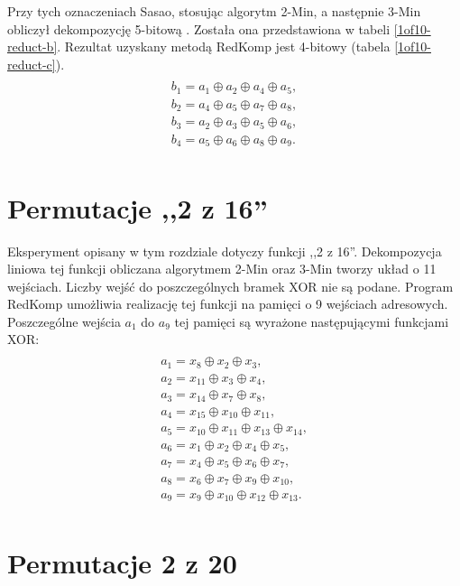 Przy tych oznaczeniach Sasao,
stosując algorytm 2-Min,
a następnie 3-Min obliczył dekompozycję 5-bitową \cite{sasao-s-min}.
Została ona przedstawiona w tabeli \ref{1of10-reduct-b}.
Rezultat uzyskany metodą RedKomp jest 4-bitowy (tabela \ref{1of10-reduct-c}).
\begin{multline} \\
b_1 = a_1 \oplus a_2 \oplus a_4 \oplus a_5, \\
b_2 = a_4 \oplus a_5 \oplus a_7 \oplus a_8, \\
b_3 = a_2 \oplus a_3 \oplus a_5 \oplus a_6, \\
b_4 = a_5 \oplus a_6 \oplus a_8 \oplus a_9. \\
\end{multline}




\section{Permutacje ,,2 z 16''}

Eksperyment opisany w tym rozdziale dotyczy funkcji ,,2 z 16''.
Dekompozycja liniowa tej funkcji obliczana algorytmem 2-Min oraz 3-Min \cite{sasao-s-min} tworzy układ o 11 wejściach.
Liczby wejść do poszczególnych bramek XOR nie są podane.
Program RedKomp umożliwia realizację tej funkcji na pamięci o 9 wejściach adresowych.
Poszczególne wejścia $a_1$ do $a_9$ tej pamięci są wyrażone następującymi funkcjami XOR:
\begin{multline} \\
a_1 = x_8 \oplus x_2 \oplus x_3, \\
a_2 = x_{11} \oplus x_3 \oplus x_4, \\
a_3 = x_{14} \oplus x_7 \oplus x_8, \\
a_4 = x_{15} \oplus x_{10} \oplus x_{11}, \\
a_5 = x_{10} \oplus x_{11} \oplus x_{13} \oplus x_{14}, \\
a_6 = x_1 \oplus x_2 \oplus x_4 \oplus x_5, \\
a_7 = x_4 \oplus x_5 \oplus x_6 \oplus x_7, \\
a_8 = x_6 \oplus x_7 \oplus x_9 \oplus x_{10}, \\
a_9 = x_9 \oplus x_{10} \oplus x_{12} \oplus x_{13}. \\
\end{multline}

\section{Permutacje 2 z 20}

